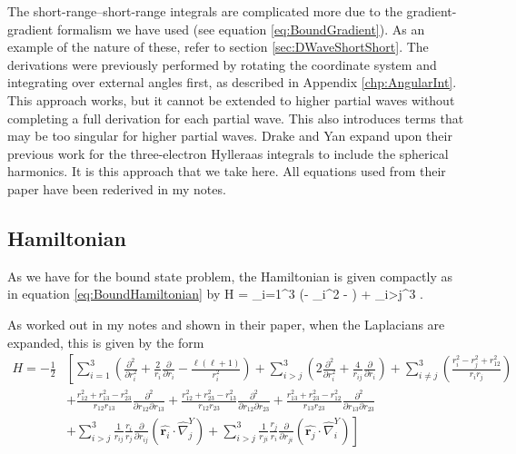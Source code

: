 \documentclass[Dissertation.tex]{subfiles}
\begin{document}
The short-range--short-range integrals are complicated more due to the gradient-gradient formalism we have used (see equation \ref{eq:BoundGradient}). As an example of the nature of these, refer to section \ref{sec:DWaveShortShort}. The derivations were previously performed by rotating the coordinate system and integrating over external angles first, as described in Appendix \ref{chp:AngularInt}. This approach works, but it cannot be extended to higher partial waves without completing a full derivation for each partial wave. This also introduces terms that may be too singular for higher partial waves. Drake and Yan \cite{Yan1997} expand upon their previous work for the three-electron Hylleraas integrals to include the spherical harmonics. It is this approach that we take here. All equations used from their paper have been rederived in my notes.


\subsection{Hamiltonian}
\label{sec:GenShortHam}
As we have for the bound state problem, the Hamiltonian is given compactly as in equation \ref{eq:BoundHamiltonian} by
\beq
\label{eq:GenHam1}
H = \sum_{i=1}^3 \left(- \nabla_i^2 -  \right) + \sum_{i>j}^3 .
\eeq

\noindent As worked out in my notes and shown in their paper, when the Laplacians are expanded, this is given by the form
\begin{align}
\label{eq:GenHam2}
\nonumber H = -\frac{1}{2} & \left[ \sum_{i=1}^3 \left( \frac{\partial^2}{\partial r_i^2} + \frac{2}{r_i} \frac{\partial}{\partial r_i} - \frac{\ell(\ell+1)}{r_i^2} \right) + \sum_{i>j}^3 \left( 2 \frac{\partial^2}{\partial r_i^2} + \frac{4}{r_{ij}} \frac{\partial}{\partial r_i} \right) + \sum_{i \neq j}^3 \left(\frac{r_i^2 - r_j^2 + r_{12}^2}{r_i r_j} \right) \right. \\
\nonumber &  \left. + \frac{r_{12}^2 + r_{13}^2 - r_{23}^2}{r_{12} r_{13}} \frac{\partial^2}{\partial r_{12} \partial r_{13}} + \frac{r_{12}^2 + r_{23}^2 - r_{13}^2}{r_{12} r_{23}} \frac{\partial^2}{\partial r_{12} \partial r_{23}} + \frac{r_{13}^2 + r_{23}^2 - r_{12}^2}{r_{13} r_{23}} \frac{\partial^2}{\partial r_{13} \partial r_{23}} \right. \\
& \left. + \sum_{i>j}^3 \frac{1}{r_{ij}} \frac{r_i}{r_j} \frac{\partial}{\partial r_{ij}} \left( \hat{\boldsymbol{r}_i} \cdot \hat{\nabla}_j^Y \right) + \sum_{i>j}^3 \frac{1}{r_{ji}} \frac{r_j}{r_i} \frac{\partial}{\partial r_{ji}} \left( \hat{\boldsymbol{r}_j} \cdot \hat{\nabla}_i^Y \right) \right]
\end{align}
\end{document}
